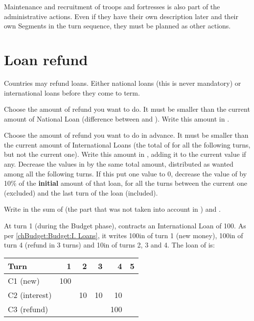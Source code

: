 \aparag Maintenance and recruitment of troops and fortresses is also part of
the administrative actions. Even if they have their own description later and
their own Segments in the turn sequence, they must be planned as other
actions.

\section{Loan refund}\label{chAdministration:Refund}
\aparag Countries may refund loans. Either national loans (this is never
mandatory) or international loans before they come to term.

 Choose the amount of refund you want to do. It must be
smaller than the current amount of National Loan (difference between
 and ).
\bparag Write this amount in .

 Choose the amount of refund you want to do in
advance. It must be smaller than the current amount of International Loans
(the total of  for all the following
turns, but not the current one).
\bparag Write this amount in , adding
it to the current value if any.
\bparag Decrease the values in  by
the same total amount, distributed as wanted among all the following turns.
\bparag If this put one value to 0\ducats, decrease the value of
 by 10\% of the \textbf{initial}
amount of that loan, for all the turns between the current one (excluded) and
the last turn of the loan (included).

\aparag Write in  the sum of
 (the part that was not taken into
account in ) and .

\begin{exemple}
  At turn 1 (during the Budget phase), \FRA contracts an International Loan of
  100\ducats. As per \ref{chBudget:Budget:I. Loans}, it writes 100\ducats in
   of turn 1 (new money), 100\ducats in
   of turn 4 (refund in 3 turns) and
  10\ducats in  of turns 2, 3 and
  4. The loan \EcoRS of \FRA is:\\
  \begin{tabular}{|l||r|r|r|r|r|}
    \hline
    Turn & 1 & 2 & 3 & 4 & 5\\
    \hline
    C1 (new) & 100 & & & &\\
    \hline
    C2 (interest) & & 10 & 10 & 10 &\\
    \hline
    C3 (refund) & & & & 100 &\\
    \hline
  \end{tabular}
\end{exemple}

